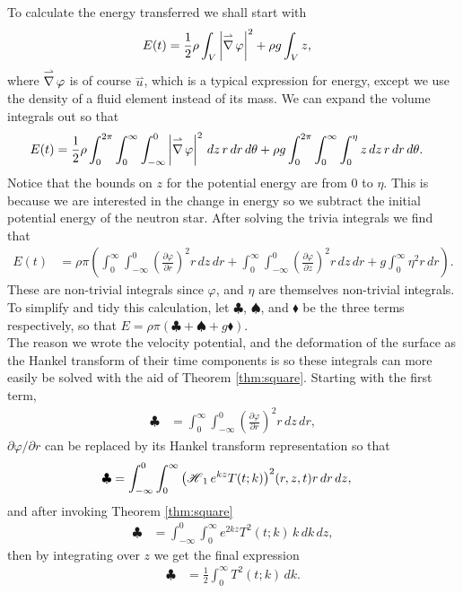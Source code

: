 To calculate the energy transferred we shall start with
\begin{align*}
E(t) &= \frac{1}{2} \rho \int_V \left| \grad \varphi \right|^2 + \rho g \int_V z,
\end{align*}
where $\grad \varphi$ is of course $\overset{\rightharpoonup}u$, which is a typical expression for energy, except we use the density of a fluid element instead of its mass. We can expand the volume integrals out so that 
\begin{align*}
E(t) &= \frac{1}{2} \rho \int_0^{2\pi} \int_0^\infty \int_{-\infty}^0 \left| \grad \varphi \right|^2 \, dz \, r \, dr \, d\theta + \rho g \int_0^{2\pi} \int_0^\infty \int_0^\eta z \, dz \, r \, dr \, d\theta.
\end{align*}
Notice that the bounds on $z$ for the potential energy are from $0$ to $\eta$. This is because we are interested in the change in energy so we subtract the initial potential energy of the neutron star. After solving the trivia integrals we find that
\begin{align*}
E(t) &= \rho \pi \left( \int_0^\infty \int_{-\infty}^0 \left( \frac{\partial \varphi}{\partial r} \right)^2 r \, dz \, dr + \int_0^\infty \int_{-\infty}^0 \left( \frac{\partial \varphi}{\partial z} \right)^2 r \, dz \, dr + g \int_0^\infty \eta^2 r \, dr \right).
\end{align*}
These are non-trivial integrals since $\varphi$, and $\eta$ are themselves non-trivial integrals. To simplify and tidy this calculation, let $\clubsuit$, $\spadesuit$, and $\blacklozenge$ be the three terms respectively, so that $E = \rho \pi (\clubsuit + \spadesuit + g \blacklozenge)$. \\

The reason we wrote the velocity potential, and the deformation of the surface as the Hankel transform of their time components is so these integrals can more easily be solved with the aid of Theorem \ref{thm:square}. Starting with the first term,
\begin{align*}
\clubsuit &= \int_0^\infty \int_{-\infty}^0 \left( \frac{\partial \varphi}{\partial r} \right)^2 r \, dz \, dr,
\end{align*}
$\partial \varphi / \partial r$ can be replaced by its Hankel transform representation so that
\begin{align*}
\clubsuit &= \int_{-\infty}^0 \int_0^\infty \Hank[1]{e^{kz}T(t;k)}^2(r,z,t) r \, dr \, dz,
\end{align*}
and after invoking Theorem \ref{thm:square}
\begin{align*}
\clubsuit &= \int_{-\infty}^0 \int_0^\infty e^{2kz} T^2(t;k) \, k \, dk \, dz,
\end{align*}
then by integrating over $z$ we get the final expression
\begin{align*}
\clubsuit &= \frac{1}{2} \int_0^\infty T^2(t;k) \, dk.
\end{align*}

